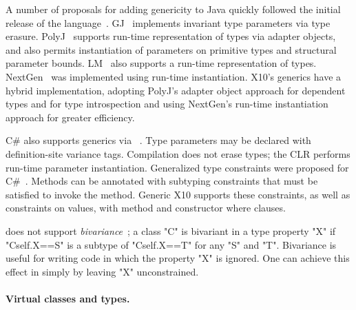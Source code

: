 A number of proposals 
for adding genericity to Java quickly followed
the initial release of
the language~\cite{GJ,Pizza,polyj,thorup97,allen03}.
GJ~\cite{GJ} implements invariant type
parameters via type erasure.
PolyJ~\cite{PolyJ} supports run-time representation of types
via adapter objects, and also permits instantiation of
parameters on primitive types and structural parameter bounds.
LM~\cite{reflective-generics,type-passing-generics} also supports
a run-time representation of types.
NextGen~\cite{nextgen,allen03} was implemented using run-time 
instantiation.
X10's generics have a hybrid implementation, adopting PolyJ's
adapter object approach for dependent types and for 
type introspection and using NextGen's run-time
instantiation approach for greater efficiency.

C\# also supports generics via ~\cite{csharp-generics}.
Type parameters may be declared
with definition-site variance tags.  Compilation does not erase
types; the CLR performs run-time parameter instantiation.
Generalized type constraints were proposed for
C\#~\cite{emir06}.  Methods can be annotated with subtyping
constraints that must be satisfied to invoke the method.
Generic X10 supports these constraints, as well as constraints
on values, with method and constructor where clauses.

\gxx does not support \emph{bivariance}~\cite{variant-parameter-types}; a class
\xcd"C" is bivariant in a type property \xcd"X" if \xcd"C{self.X==S}" is a
subtype of \xcd"C{self.X==T}" for any \xcd"S" and \xcd"T".  Bivariance is
useful for writing code in which the property \xcd"X" is ignored.  One can
achieve  this effect in \gxx simply by leaving \xcd"X" unconstrained.


\paragraph{Virtual classes and types.}

